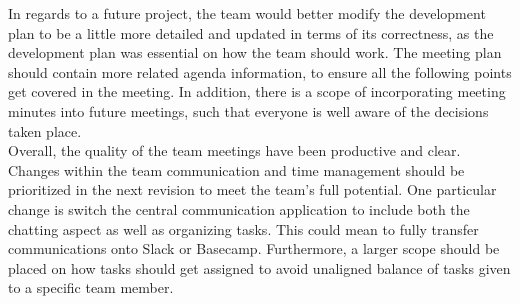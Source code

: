 \documentclass{article}
\begin{document}
\noindent
In regards to a future project, the team would better modify the development plan to be a little more detailed and updated in terms of its correctness, as the development plan was essential on how the team should work. The meeting plan should contain more related agenda information, to ensure all the following points get covered in the meeting. In addition, there is a scope of incorporating meeting minutes into future meetings, such that everyone is well aware of the decisions taken place. \\

\noindent
Overall, the quality of the team meetings have been productive and clear. Changes within the team communication and time management should be prioritized in the next revision to meet the team's full potential. One particular change is switch the central communication application to include both the chatting aspect as well as organizing tasks. This could mean to fully transfer communications onto Slack or Basecamp. Furthermore, a larger scope should be placed on how tasks should get assigned to avoid unaligned balance of tasks given to a specific team member.
\end{document}
